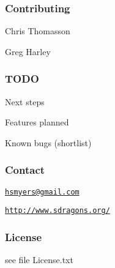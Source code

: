 \subsubsection*{Contributing}


\begin{DoxyItemize}
\item Chris Thomasson
\item Greg Harley
\end{DoxyItemize}

\subsubsection*{T\+O\+DO}


\begin{DoxyItemize}
\item Next steps
\item Features planned
\item Known bugs (shortlist)
\end{DoxyItemize}

\subsubsection*{Contact}


\begin{DoxyItemize}
\item \href{mailto:hsmyers@gmail.com}{\tt hsmyers@gmail.\+com}
\item \href{http://www.sdragons.org/}{\tt http\+://www.\+sdragons.\+org/}
\end{DoxyItemize}

\subsubsection*{License}


\begin{DoxyItemize}
\item see file License.\+txt 
\end{DoxyItemize}